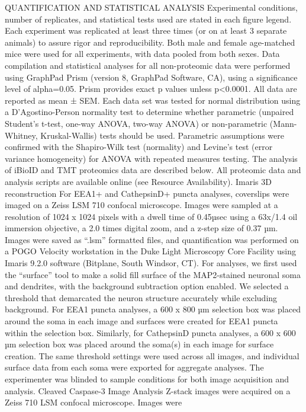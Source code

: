 QUANTIFICATION AND STATISTICAL ANALYSIS
Experimental conditions, number of replicates, and statistical tests used are
stated in each figure legend. Each experiment was replicated at least three
times (or on at least 3 separate animals) to assure rigor and reproducibility.
Both male and female age-matched mice were used for all experiments, with data
pooled from both sexes. Data compilation and statistical analyses for all
non-proteomic data were performed using GraphPad Prism (version 8, GraphPad
Software, CA), using a significance level of alpha=0.05. Prism provides exact p
values unless p<0.0001. All data are reported as mean ± SEM. Each data set was
tested for normal distribution using a D’Agostino-Person normality test to
determine whether parametric (unpaired Student’s t-test, one-way ANOVA, two-way
ANOVA) or non-parametric (Mann-Whitney, Kruskal-Wallis) tests should be used.
Parametric assumptions were confirmed with the Shapiro-Wilk test (normality) and
Levine’s test (error variance homogeneity) for ANOVA with repeated measures
testing. The analysis of iBioID and TMT proteomics data are described below. All
proteomic data and analysis scripts are available online (see Resource
Availability).
Imaris 3D reconstruction
For EEA1+ and CathepsinD+ puncta analyses, coverslips were imaged on a Zeiss LSM
710 confocal microscope. Images were sampled at a resolution of 1024 x 1024
pixels with a dwell time of 0.45µsec using a 63x/1.4 oil immersion objective, a
2.0 times digital zoom, and a z-step size of 0.37 µm. Images were saved as
“.lsm” formatted files, and quantification was performed on a POGO Velocity
workstation in the Duke Light Microscopy Core Facility using Imaris 9.2.0
software (Bitplane, South Windsor, CT). For analyses, we first used the
“surface” tool to make a solid fill surface of the MAP2-stained neuronal soma
and dendrites, with the background subtraction option enabled. We selected a
threshold that demarcated the neuron structure accurately while excluding
background. For EEA1 puncta analyses, a 600 x 800 µm selection box was placed
around the soma in each image and surfaces were created for EEA1 puncta within
the selection box. Similarly, for CathepsinD puncta analyses, a 600 x 600 µm
selection box was placed around the soma(s) in each image for surface creation.
The same threshold settings were used across all images, and individual surface
data from each soma were exported for aggregate analyses. The experimenter was
blinded to sample conditions for both image acquisition and analysis. 
Cleaved Caspase-3 Image Analysis
Z-stack images were acquired on a Zeiss 710 LSM confocal microscope. Images were
